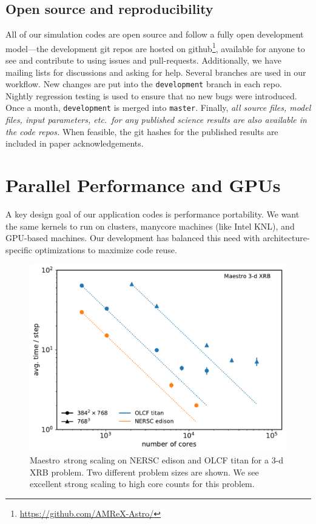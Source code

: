 \documentclass[a4paper]{jpconf}
\newcommand{\maestro}{{\sffamily Maestro}}
\begin{document}
\subsection{Open source and reproducibility}

All of our simulation codes are open source and follow a fully open
development model---the development git repos are hosted on
github\footnote{\url{https://github.com/AMReX-Astro/}}, available for
anyone to see and contribute to using issues and pull-requests.
Additionally, we have mailing lists for discussions and asking for
help.  Several branches are used in our workflow.  New changes are put
into the {\tt development} branch in each repo.  Nightly regression
testing is used to ensure that no new bugs were introduced.  Once a
month, {\tt development} is merged into {\tt master}.  Finally, {\em all source
  files, model files, input parameters, etc.\ for any published
  science results are also available in the code repos.}  When
feasible, the git hashes for the published results are included in
paper acknowledgements.




\section{Parallel Performance and GPUs}


A key design goal of our application codes is performance portability.
We want the same kernels to run on clusters, manycore machines (like
Intel KNL), and GPU-based machines.  Our development has balanced this
need with architecture-specific optimizations to maximize code reuse.

\begin{figure}[t]
\centering
\includegraphics[width=0.48\linewidth]{titan_edison_maestro_scaling}
\begin{minipage}[b]{0.48\linewidth}
\caption{\label{fig:maestro_scaling} \maestro\ strong scaling on NERSC
  edison and OLCF titan for a 3-d XRB problem.  Two different problem
  sizes are shown.  We see excellent strong scaling to high core counts
  for this problem.\vspace{2em}}
\end{minipage}
\end{figure}
\end{document}
